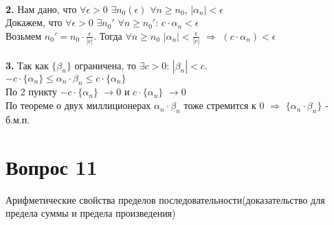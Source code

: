 \documentclass{article}
\DeclareMathOperator{\Exists}{\exists}
\DeclareMathOperator{\Forall}{\forall}
\begin{document}
   \\
   \textbf{2. }Нам дано, что $\Forall \epsilon > 0$ $\Exists n_0(\epsilon)$ $\Forall n \geq n_0$, $|\alpha_n| < \epsilon$ \\
   Докажем, что $\Forall \epsilon > 0$ $\Exists n_0'$ $\Forall n \geq n_0'$: $c \cdot \alpha_n < \epsilon$\\
   Возьмем $n_0' = n_0 \cdot \frac{\epsilon}{|c|}$. Тогда $\Forall n \geq n_0$ $|\alpha_n| < \frac{\epsilon}{|c|}$ $\Rightarrow$ $(c \cdot \alpha_n) < \epsilon$ \\
   \\
   \textbf{3. }Так как $\{ \beta_n \}$ ограничена, то $\Exists c >0$: $|\beta_n| < c$. \\
   $-c \cdot \{ \alpha_n \} \leq \alpha_n \cdot \beta_n \leq c \cdot \{ \alpha_n \}$ \\
   По 2 пункту $-c \cdot \{ \alpha_n \}$ $\rightarrow 0$ и $c \cdot \{ \alpha_n \}$ $\rightarrow 0$\\
   По теореме о двух миллиционерах $\alpha_n \cdot \beta_n$ тоже стремится к 0 $\Rightarrow$ $\{ \alpha_n \cdot \beta_n \}$ - б.м.п.\\
 
 
 
\section*{Вопрос 11}
\begin{center}
Арифметические свойства пределов последовательности(доказательство для предела суммы и предела произведения)
\end{center}
\end{document}
